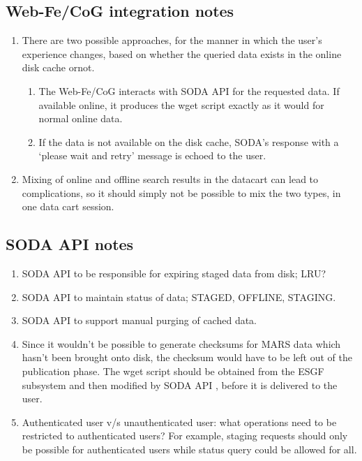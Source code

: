 \documentclass[oneside,12pt]{memoir}
\def\phname{SODA API{ }}
\begin{document}
\subsection{Web-Fe/CoG integration notes}
\begin{enumerate}
\item There are two possible approaches, for the manner in which the user's experience changes, based on whether the queried data exists in the online disk cache ornot.
\begin{enumerate}
\item The Web-Fe/CoG interacts with \phname for the requested data. If available online, it produces the wget script exactly as it would for normal online data.
\item If the data is not available on the disk cache, SODA’s response with a `please wait and retry' message is echoed to the user.
\end{enumerate}
\item Mixing of online and offline search results in the datacart can lead to complications, so it should simply not be possible to mix the two types, in one data cart session.
\end{enumerate}
\subsection{\phname notes}
\begin{enumerate}
\item \phname to be responsible for expiring staged data from disk; LRU?
\item \phname to maintain status of data; STAGED, OFFLINE, STAGING.
\item \phname to support manual purging of cached data.
\item Since it wouldn't be possible to generate checksums for MARS data which hasn't been
brought onto disk, the checksum would have to be left out of the publication phase.
The wget script should be obtained from the ESGF subsystem and then modiﬁed by \phname, before it is delivered to the user.
\item Authenticated user v/s unauthenticated user: what operations need to be restricted to authenticated users? For example, staging requests should only be possible for authenticated users while status query could be allowed for all.
\end{enumerate}
\end{document}
